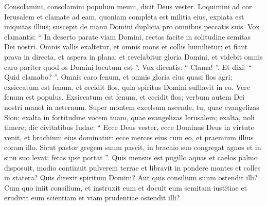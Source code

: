 \begin{biblechapter}
\begin{biblechapter}
\begin{biblechapter}
\begin{biblechapter}
\begin{biblechapter}
\begin{biblechapter}
\begin{biblechapter}
\begin{biblechapter}
\begin{biblechapter}
\begin{biblechapter}
\begin{biblechapter}
\begin{biblechapter}
\begin{biblechapter}
\begin{biblechapter}
\begin{biblechapter}
\begin{biblechapter}
\begin{biblechapter}
\begin{biblechapter}
\begin{biblechapter}
\begin{biblechapter}
\begin{biblechapter}
\begin{biblechapter}
\begin{biblechapter}
\begin{biblechapter}
\begin{biblechapter}
\begin{biblechapter}
\begin{biblechapter}
\begin{biblechapter}
\begin{biblechapter}
\begin{biblechapter}
\begin{biblechapter}
\begin{biblechapter}
\begin{biblechapter}
\begin{biblechapter}
\begin{biblechapter}
\begin{biblechapter}
\begin{biblechapter}
\begin{biblechapter}
\begin{biblechapter}
\begin{biblechapter}
\verse Consolamini, consolamini populum meum,
 dicit Deus vester.
 \verse Loquimini ad cor Ierusalem
 et clamate ad eam,
 quoniam completa est militia eius,
 expiata est iniquitas illius;
 suscepit de manu Domini
 duplicia pro omnibus peccatis suis.
 \verse Vox clamantis:
 “ In deserto parate viam Domini,
 rectas facite in solitudine
 semitas Dei nostri.
 \verse Omnis vallis exaltetur,
 et omnis mons et collis humilietur;
 et fiant prava in directa,
 et aspera in plana:
 \verse et revelabitur gloria Domini,
 et videbit omnis caro pariter
 quod os Domini locutum est ”.
 \verse Vox dicentis: “ Clama! ”.
 Et dixi: “ Quid clamabo? ”.
 Omnis caro fenum,
 et omnis gloria eius quasi flos agri;
 \verse exsiccatum est fenum, et cecidit flos,
 quia spiritus Domini sufflavit in eo. Vere fenum est populus.
 \verse Exsiccatum est fenum, et cecidit flos;
 verbum autem Dei nostri manet in aeternum.
 \verse Super montem excelsum ascende,
 tu, quae evangelizas Sion;
 exalta in fortitudine vocem tuam,
 quae evangelizas Ierusalem;
 exalta, noli timere;
 dic civitatibus Iudae:
 “ Ecce Deus vester,
 \verse ecce Dominus Deus in virtute venit,
 et brachium eius dominatur:
 ecce merces eius cum eo,
 et praemium illius coram illo.
 \verse Sicut pastor gregem suum pascit,
 in brachio suo congregat agnos
 et in sinu suo levat;
 fetas ipse portat ”.
 \verse Quis mensus est pugillo aquas
 et caelos palmo disposuit,
 modio continuit pulverem terrae
 et libravit in pondere montes
 et colles in statera?
 \verse Quis direxit spiritum Domini?
 Aut quis consilium suum
 ostendit illi?
 \verse Cum quo iniit consilium, et instruxit eum
 et docuit eum semitam iustitiae
 et erudivit eum scientiam
 et viam prudentiae ostendit illi?

\end{biblechapter}
\end{biblechapter}
\end{biblechapter}
\end{biblechapter}
\end{biblechapter}
\end{biblechapter}
\end{biblechapter}
\end{biblechapter}
\end{biblechapter}
\end{biblechapter}
\end{biblechapter}
\end{biblechapter}
\end{biblechapter}
\end{biblechapter}
\end{biblechapter}
\end{biblechapter}
\end{biblechapter}
\end{biblechapter}
\end{biblechapter}
\end{biblechapter}
\end{biblechapter}
\end{biblechapter}
\end{biblechapter}
\end{biblechapter}
\end{biblechapter}
\end{biblechapter}
\end{biblechapter}
\end{biblechapter}
\end{biblechapter}
\end{biblechapter}
\end{biblechapter}
\end{biblechapter}
\end{biblechapter}
\end{biblechapter}
\end{biblechapter}
\end{biblechapter}
\end{biblechapter}
\end{biblechapter}
\end{biblechapter}
\end{biblechapter}
